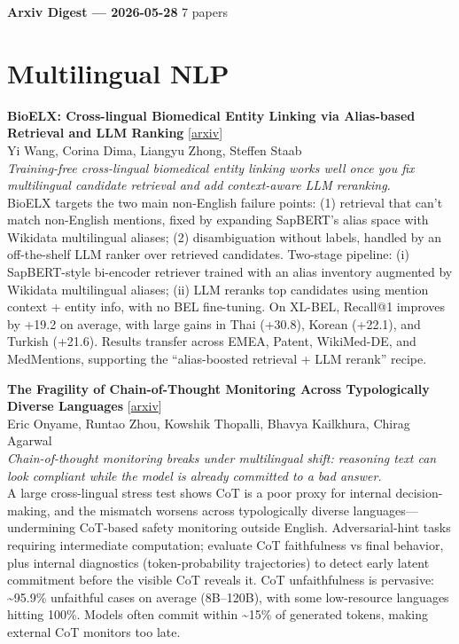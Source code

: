 \documentclass[12pt,letterpaper]{article}
\begin{document}
{\footnotesize\textbf{Arxiv Digest --- 2026-05-28} \hfill 7 papers}

\smallskip

\section*{Multilingual NLP}

{\small\textbf{BioELX: Cross-lingual Biomedical Entity Linking via Alias-based Retrieval and LLM Ranking}} {\scriptsize[\href{https://arxiv.org/abs/2605.27380}{arxiv}]}\\
{\scriptsize Yi Wang, Corina Dima, Liangyu Zhong, Steffen Staab}\\

{\small\textit{Training-free cross-lingual biomedical entity linking works well once you fix multilingual candidate retrieval and add context-aware LLM reranking.}}\\[1pt]
{\footnotesize BioELX targets the two main non-English failure points: (1) retrieval that can't match non-English mentions, fixed by expanding SapBERT's alias space with Wikidata multilingual aliases; (2) disambiguation without labels, handled by an off-the-shelf LLM ranker over retrieved candidates. Two-stage pipeline: (i) SapBERT-style bi-encoder retriever trained with an alias inventory augmented by Wikidata multilingual aliases; (ii) LLM reranks top candidates using mention context + entity info, with no BEL fine-tuning. On XL-BEL, Recall@1 improves by +19.2 on average, with large gains in Thai (+30.8), Korean (+22.1), and Turkish (+21.6). Results transfer across EMEA, Patent, WikiMed-DE, and MedMentions, supporting the ``alias-boosted retrieval + LLM rerank'' recipe.}

\medskip

{\small\textbf{The Fragility of Chain-of-Thought Monitoring Across Typologically Diverse Languages}} {\scriptsize[\href{https://arxiv.org/abs/2605.27901}{arxiv}]}\\
{\scriptsize Eric Onyame, Runtao Zhou, Kowshik Thopalli, Bhavya Kailkhura, Chirag Agarwal}\\

{\small\textit{Chain-of-thought monitoring breaks under multilingual shift: reasoning text can look compliant while the model is already committed to a bad answer.}}\\[1pt]
{\footnotesize A large cross-lingual stress test shows CoT is a poor proxy for internal decision-making, and the mismatch worsens across typologically diverse languages---undermining CoT-based safety monitoring outside English. Adversarial-hint tasks requiring intermediate computation; evaluate CoT faithfulness vs final behavior, plus internal diagnostics (token-probability trajectories) to detect early latent commitment before the visible CoT reveals it. CoT unfaithfulness is pervasive: \textasciitilde{}95.9\% unfaithful cases on average (8B--120B), with some low-resource languages hitting 100\%. Models often commit within \textasciitilde{}15\% of generated tokens, making external CoT monitors too late.}
\end{document}
